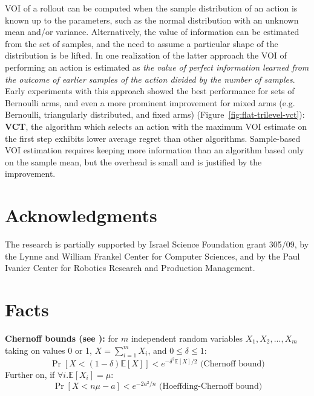 \documentclass{article}
\newcommand {\IE} {\ensuremath {\mathbb{E}}}
\begin{document}
VOI of a rollout can be computed when the sample distribution of an
action is known up to the parameters, such as the normal distribution
with an unknown mean and/or variance. Alternatively, the value of
information can be estimated from the set of samples, and the need to
assume a particular shape of the distribution is be lifted. In one
realization of the latter approach the VOI of performing an action is
estimated as \emph{the value of perfect information learned from the outcome
of earlier samples of the action divided by the number of
samples}. Early experiments with this approach showed the best
performance for sets of Bernoulli arms, and even a more prominent
improvement for mixed arms (e.g. Bernoulli, triangularly distributed,
and fixed arms) (Figure~\ref{fig:flat-trilevel-vct}):
\textbf{VCT}, the algorithm which selects an action with the maximum VOI estimate on
the first step exhibits lower average regret than other algorithms.
Sample-based VOI estimation requires keeping more information than an
algorithm based only on the sample
mean, but the overhead is small and
is justified by the improvement.

\section*{Acknowledgments}

The research is partially supported by Israel
Science Foundation grant 305/09, by the Lynne and William Frankel
Center for Computer Sciences, and by the Paul Ivanier Center for
Robotics Research and Production Management.

\clearpage
\appendix

\section{Facts}

{\bf Chernoff bounds (see \cite{Hagerup.chernoff}):} for $m$ independent random variables $X_1, X_2, ..., X_m$
taking on values 0 or 1, $X=\sum_{i=1}^m X_i$, and $0\le\delta\le 1$:
\begin{equation}
\Pr[X < (1-\delta)\IE[X]] < e^{-\delta^2\IE[X]/2} \mbox{ (Chernoff bound)}
\label{eq:chernoff-bound}
\end{equation}
Further on, if $\forall i. \IE[X_i]=\mu$:
\begin{equation}
\Pr[X < n\mu-a] <  e^{-2a^2/n}
\label{eq:chernoff-hoeffding-bound} \mbox{ (Hoeffding-Chernoff bound)}
\end{equation}
\end{document}
